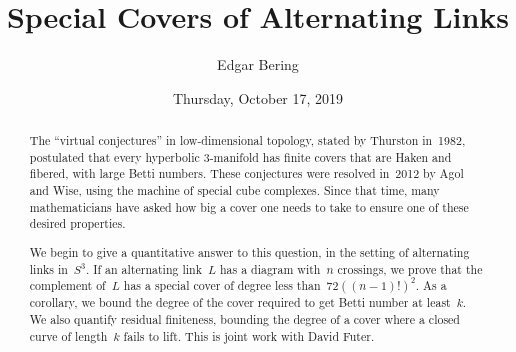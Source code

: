 \documentclass{UAmathtalk}
\author{Edgar Bering}
\title{Special Covers of Alternating Links}
\date{Thursday, October 17, 2019}
\begin{document}
\maketitle

\begin{abstract}
The ``virtual conjectures'' in low-dimensional topology, stated by Thurston in~1982, postulated that every hyperbolic 3-manifold has finite covers that are Haken and fibered, with large Betti numbers. These conjectures were resolved in~2012 by Agol and Wise, using the machine of special cube complexes. Since that time, many mathematicians have asked how big a cover one needs to take to ensure one of these desired properties.

We begin to give a quantitative answer to this question, in the setting of alternating links in~$S^3$. If an alternating link~$L$ has a diagram with~$n$ crossings, we prove that the complement of~$L$ has a special cover of degree less than~$72((n-1)!)^2$. As a corollary, we bound the degree of the cover required to get Betti number at least~$k$. We also quantify residual finiteness, bounding the degree of a cover where a closed curve of length~$k$ fails to lift. This is joint work with David Futer.
\end{abstract}
\end{document}
